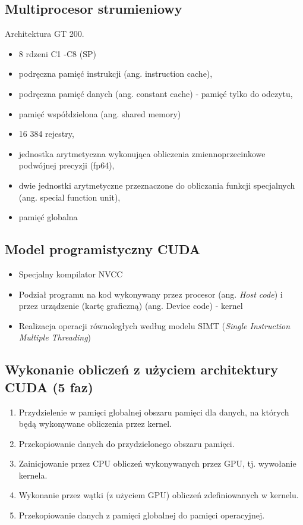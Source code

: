 \documentclass[a4paper,twoside]{article}
\begin{document}
\subsection{Multiprocesor strumieniowy}
Architektura GT 200.
\begin{itemize}
	\item 8 rdzeni C1 -C8 (SP)
	\item podręczna pamięć instrukcji (ang. instruction cache),
	\item podręczna pamięć danych (ang. constant cache) - pamięć tylko do odczytu,
	\item pamięć współdzielona (ang. shared memory)
	\item 16 384 rejestry,
	\item jednostka arytmetyczna wykonująca obliczenia zmiennoprzecinkowe podwójnej precyzji (fp64),
	\item dwie jednostki arytmetyczne przeznaczone do obliczania funkcji specjalnych (ang. special function unit),
	\item pamięć globalna
\end{itemize}
\subsection{Model programistyczny CUDA}
\begin{itemize}
	\item Specjalny kompilator NVCC
	\item Podział programu na kod wykonywany przez procesor (ang. \emph{Host code}) i przez urządzenie (kartę graficzną) (ang. Device code) - kernel
	\item Realizacja operacji równoległych według modelu SIMT (\emph{Single Instruction Multiple Threading})
\end{itemize}
\subsection{Wykonanie obliczeń z użyciem architektury CUDA (5 faz)}
\begin{enumerate}
	\item Przydzielenie w pamięci globalnej obszaru pamięci dla danych, na których będą wykonywane obliczenia przez kernel.
	\item Przekopiowanie danych do przydzielonego obszaru pamięci.
	\item Zainicjowanie przez CPU obliczeń wykonywanych przez GPU, tj. wywołanie kernela.
	\item Wykonanie przez wątki (z użyciem GPU) obliczeń zdefiniowanych w kernelu.
	\item Przekopiowanie danych z pamięci globalnej do pamięci operacyjnej.
\end{enumerate}
\end{document}
